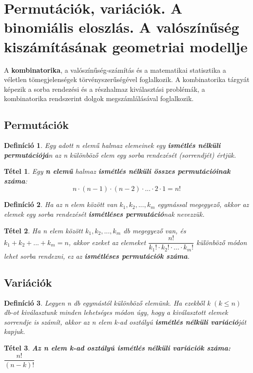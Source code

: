 \documentclass[12pt,a4paper]{article}
\newtheorem{theorem}{Tétel} [section]
\newtheorem{definition}{Definíció} [section]
\begin{document}
\newpage






\section{Permutációk, variációk. A binomiális eloszlás. A valószínűség kiszámításának geometriai modellje}
A \textbf{kombinatorika}, a valószínűség-számítás és a matematikai statisztika a véletlen tömegjelenségek törvényszerűségével foglalkozik. A kombinatorika tárgyát képezik a sorba rendezési és a részhalmaz kiválasztási problémák, a kombinatorika rendszerint dolgok megszámlálásával foglalkozik.

\subsection{Permutációk}
\begin{definition}
Egy adott n elemű halmaz elemeinek egy \textbf{ismétlés nélküli permutációjá}n az n különböző elem egy sorba rendezését (sorrendjét) értjük.
\end{definition}
\begin{theorem}
Egy \textbf{n elemű} halmaz \textbf{ismétlés nélküli összes permutációinak száma}:
\[n\cdot (n-1)\cdot (n-2)\cdot ... \cdot 2\cdot 1=n!\]
\end{theorem}
\begin{definition}
Ha az n elem között van $k_1, k_2, ..., k_m$ egymással megegyező, akkor az elemek egy sorba rendezését \textbf{ismétléses permutáció}nak nevezzük.
\end{definition}
\begin{theorem}
Ha n elem között $k_1, k_2, ..., k_m$ db megegyező van, és $k_1+ k_2+ ...+ k_m=n$, akkor ezeket az elemeket $\dfrac{n!}{k_1!\cdot k_2!\cdot ...\cdot k_m!}$ különböző módon lehet sorba rendezni, ez az \textbf{ismétléses permutációk száma}.
\end{theorem}

\subsection{Variációk}
\begin{definition}
Legyen n db egymástól különböző elemünk. Ha ezekből k $(k \leq n)$ db-ot kiválasztunk minden lehetséges módon úgy, hogy a kiválasztott elemek sorrendje is számít, akkor az n elem k-ad osztályú \textbf{ismétlés nélküli variáció}ját kapjuk.
\end{definition}
\begin{theorem}
\textbf{Az n elem k-ad osztályú ismétlés nélküli variációk száma:} $\dfrac{n!}{(n-k)!}$
\end{theorem}
\end{document}
